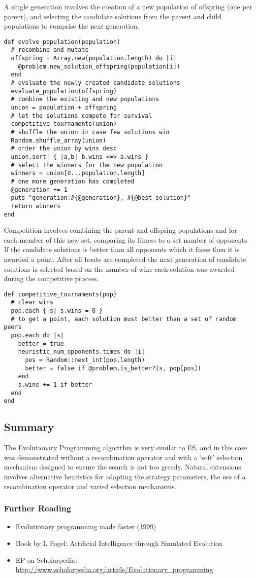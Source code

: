 A single generation involves the creation of a new population of offspring (one per parent), and selecting the candidate solutions from the parent and child populations to comprise the next generation. 

\begin{lstlisting}
def evolve_population(population)
  # recombine and mutate
  offspring = Array.new(population.length) do |i|
    @problem.new_solution_offspring(population[i])
  end
  # evaluate the newly created candidate solutions
  evaluate_population(offspring)
  # combine the existing and new populations
  union = population + offspring
  # let the solutions compete for survival    
  competitive_tournaments(union)
  # shuffle the union in case few solutions win
  Random.shuffle_array(union)
  # order the union by wins desc
  union.sort! { |a,b| b.wins <=> a.wins }
  # select the winners for the new population
  winners = union[0...population.length]
  # one more generation has completed
  @generation += 1
  puts "generation:#{@generation}, #{@best_solution}"    
  return winners
end
\end{lstlisting}

Competition involves combining the parent and offspring populations and for each member of this new set, comparing its fitness to a set number of opponents. If the candidate solutions is better than all opponents which it faces then it is awarded a point. After all bouts are completed the next generation of candidate solutions is selected based on the number of wins each solution was awarded during the competitive process.

\begin{lstlisting}
def competitive_tournaments(pop)
  # clear wins
  pop.each {|s| s.wins = 0 }
  # to get a point, each solution must better than a set of random peers
  pop.each do |s|
    better = true
    heuristic_num_opponents.times do |i|
      pos = Random::next_int(pop.length)
      better = false if @problem.is_better?(s, pop[pos])
    end
    s.wins += 1 if better
  end
end
\end{lstlisting}

\subsection{Summary}
The Evolutionary Programming algorithm is very similar to ES, and in this case was demonstrated without a recombination operator and with a `soft' selection mechanism designed to ensure the search is not too greedy. Natural extensions involves alternative heuristics for adapting the strategy parameters, the use of a recombination operator and varied selection mechanisms.

\subsubsection{Further Reading}

\begin{itemize}
	\item Evolutionary programming made faster (1999)
	\item Book by L Fogel: Artificial Intelligence through Simulated Evolution
	\item EP on Scholarpedia: \url{http://www.scholarpedia.org/article/Evolutionary_programming}
\end{itemize}